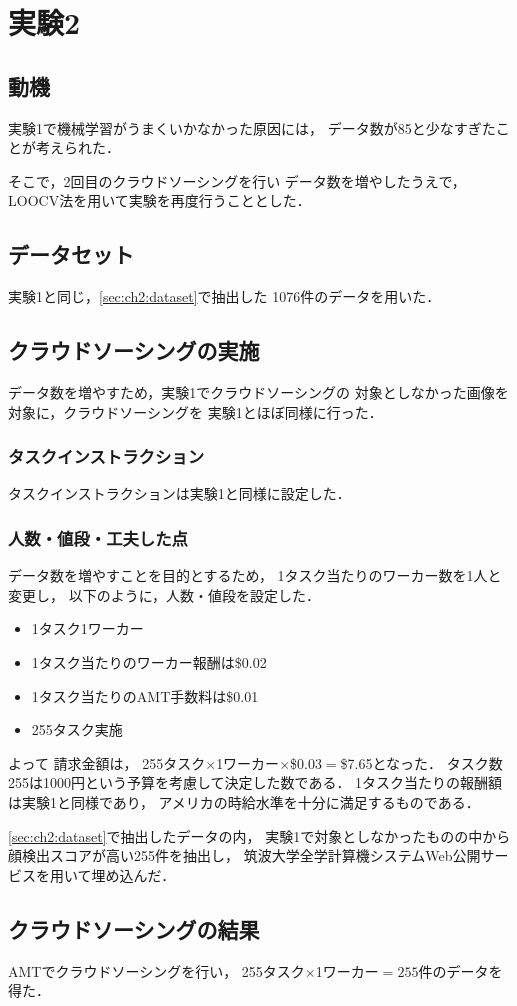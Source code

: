 \chapter{実験2}
\section{動機}
実験1で機械学習がうまくいかなかった原因には，
データ数が85と少なすぎたことが考えられた．

そこで，2回目のクラウドソーシングを行い
データ数を増やしたうえで，
LOOCV法を用いて実験を再度行うこととした．
\section{データセット}
実験1と同じ，\ref{sec:ch2:dataset}で抽出した
1076件のデータを用いた．
\section{クラウドソーシングの実施}
データ数を増やすため，実験1でクラウドソーシングの
対象としなかった画像を対象に，クラウドソーシングを
実験1とほぼ同様に行った．
\subsection{タスクインストラクション}
タスクインストラクションは実験1と同様に設定した．
\subsection{人数・値段・工夫した点}
データ数を増やすことを目的とするため，
1タスク当たりのワーカー数を1人と変更し，
以下のように，人数・値段を設定した．
\begin{itemize}
  \item 1タスク1ワーカー
  \item 1タスク当たりのワーカー報酬は\$0.02
  \item 1タスク当たりのAMT手数料は\$0.01
  \item 255タスク実施
\end{itemize}
よって
請求金額は，
255タスク$\times$1ワーカー$\times$\$0.03$=$\$7.65となった．
タスク数255は1000円という予算を考慮して決定した数である．
1タスク当たりの報酬額は実験1と同様であり，
アメリカの時給水準を十分に満足するものである．

\ref{sec:ch2:dataset}で抽出したデータの内，
実験1で対象としなかったものの中から
顔検出スコアが高い255件を抽出し，
筑波大学全学計算機システムWeb公開サービスを用いて埋め込んだ．
\section{クラウドソーシングの結果}
AMTでクラウドソーシングを行い，
255タスク$\times$1ワーカー$=255$件のデータを得た．
